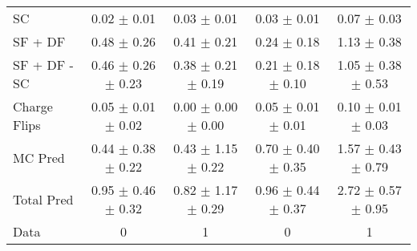 \begin{tabular}{l|cccc}
                                 SC &  0.02 $\pm$  0.01 &  0.03 $\pm$  0.01 &  0.03 $\pm$  0.01 &  0.07 $\pm$  0.03 \\
                            SF + DF &  0.48 $\pm$  0.26 &  0.41 $\pm$  0.21 &  0.24 $\pm$  0.18 &  1.13 $\pm$  0.38 \\
\hline
                       SF + DF - SC &  0.46 $\pm$  0.26 $\pm$  0.23 &  0.38 $\pm$  0.21 $\pm$  0.19 &  0.21 $\pm$  0.18 $\pm$  0.10 &  1.05 $\pm$  0.38 $\pm$  0.53 \\
\hline\hline
                       Charge Flips &  0.05 $\pm$  0.01 $\pm$  0.02 &  0.00 $\pm$  0.00 $\pm$  0.00 &  0.05 $\pm$  0.01 $\pm$  0.01 &  0.10 $\pm$  0.01 $\pm$  0.03 \\
\hline
                            MC Pred &  0.44 $\pm$  0.38 $\pm$  0.22 &  0.43 $\pm$  1.15 $\pm$  0.22 &  0.70 $\pm$  0.40 $\pm$  0.35 &  1.57 $\pm$  0.43 $\pm$  0.79 \\
\hline
                         Total Pred &  0.95 $\pm$  0.46 $\pm$  0.32 &  0.82 $\pm$  1.17 $\pm$  0.29 &  0.96 $\pm$  0.44 $\pm$  0.37 &  2.72 $\pm$  0.57 $\pm$  0.95 \\
\hline\hline
                               Data &     0 &     1 &     0 &     1 \\
\hline\hline
\end{tabular}

